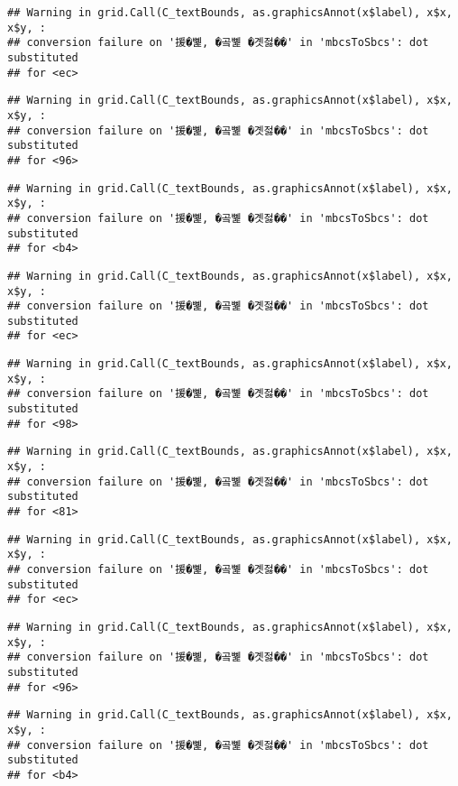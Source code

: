\documentclass[
]{article}
\begin{document}
\begin{verbatim}
## Warning in grid.Call(C_textBounds, as.graphicsAnnot(x$label), x$x, x$y, :
## conversion failure on '援�뼱, �곸뼱 �곗젏��' in 'mbcsToSbcs': dot substituted
## for <ec>
\end{verbatim}

\begin{verbatim}
## Warning in grid.Call(C_textBounds, as.graphicsAnnot(x$label), x$x, x$y, :
## conversion failure on '援�뼱, �곸뼱 �곗젏��' in 'mbcsToSbcs': dot substituted
## for <96>
\end{verbatim}

\begin{verbatim}
## Warning in grid.Call(C_textBounds, as.graphicsAnnot(x$label), x$x, x$y, :
## conversion failure on '援�뼱, �곸뼱 �곗젏��' in 'mbcsToSbcs': dot substituted
## for <b4>
\end{verbatim}

\begin{verbatim}
## Warning in grid.Call(C_textBounds, as.graphicsAnnot(x$label), x$x, x$y, :
## conversion failure on '援�뼱, �곸뼱 �곗젏��' in 'mbcsToSbcs': dot substituted
## for <ec>
\end{verbatim}

\begin{verbatim}
## Warning in grid.Call(C_textBounds, as.graphicsAnnot(x$label), x$x, x$y, :
## conversion failure on '援�뼱, �곸뼱 �곗젏��' in 'mbcsToSbcs': dot substituted
## for <98>
\end{verbatim}

\begin{verbatim}
## Warning in grid.Call(C_textBounds, as.graphicsAnnot(x$label), x$x, x$y, :
## conversion failure on '援�뼱, �곸뼱 �곗젏��' in 'mbcsToSbcs': dot substituted
## for <81>
\end{verbatim}

\begin{verbatim}
## Warning in grid.Call(C_textBounds, as.graphicsAnnot(x$label), x$x, x$y, :
## conversion failure on '援�뼱, �곸뼱 �곗젏��' in 'mbcsToSbcs': dot substituted
## for <ec>
\end{verbatim}

\begin{verbatim}
## Warning in grid.Call(C_textBounds, as.graphicsAnnot(x$label), x$x, x$y, :
## conversion failure on '援�뼱, �곸뼱 �곗젏��' in 'mbcsToSbcs': dot substituted
## for <96>
\end{verbatim}

\begin{verbatim}
## Warning in grid.Call(C_textBounds, as.graphicsAnnot(x$label), x$x, x$y, :
## conversion failure on '援�뼱, �곸뼱 �곗젏��' in 'mbcsToSbcs': dot substituted
## for <b4>
\end{verbatim}
\end{document}
